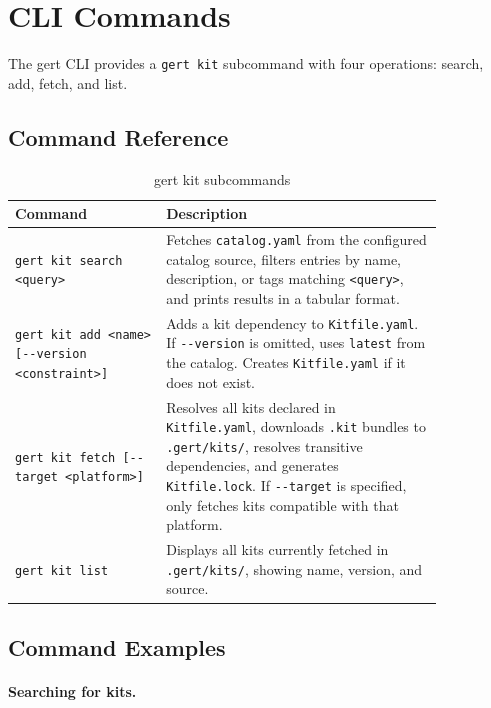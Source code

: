 \section{CLI Commands}
\label{sec:catalog-cli}

The gert CLI provides a \texttt{gert kit} subcommand with four operations: search, add, fetch, and list.

\subsection{Command Reference}

\begin{table}[ht]
\centering
\caption{gert kit subcommands}
\label{tab:kit-commands}
\small
\begin{tabular}{p{0.30\linewidth}p{0.55\linewidth}}
\toprule
\textbf{Command} & \textbf{Description} \\
\midrule
\texttt{gert kit search <query>} &
  Fetches \texttt{catalog.yaml} from the configured catalog source, filters entries by name, description, or tags matching \texttt{<query>}, and prints results in a tabular format. \\
\midrule
\texttt{gert kit add <name> [\texttt{-{}-version} <constraint>]} &
  Adds a kit dependency to \texttt{Kitfile.yaml}. If \texttt{-{}-version} is omitted, uses \texttt{latest} from the catalog. Creates \texttt{Kitfile.yaml} if it does not exist. \\
\midrule
\texttt{gert kit fetch [\texttt{-{}-target} <platform>]} &
  Resolves all kits declared in \texttt{Kitfile.yaml}, downloads \texttt{.kit} bundles to \texttt{.gert/kits/}, resolves transitive dependencies, and generates \texttt{Kitfile.lock}. If \texttt{-{}-target} is specified, only fetches kits compatible with that platform. \\
\midrule
\texttt{gert kit list} &
  Displays all kits currently fetched in \texttt{.gert/kits/}, showing name, version, and source. \\
\bottomrule
\end{tabular}
\end{table}

\subsection{Command Examples}

\paragraph{Searching for kits.}

